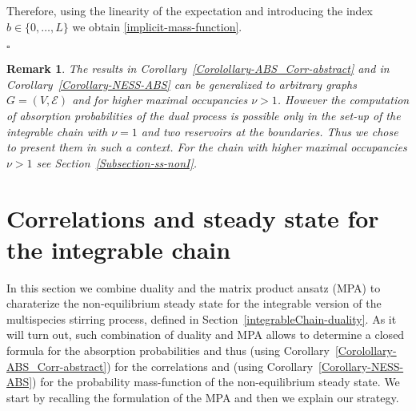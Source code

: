 \documentclass[10pt]{article}
\numberwithin{equation}{section}
\numberwithin{equation}{subsection}
\newtheorem{remark}{Remark}
\begin{document}
Therefore, using the linearity of the expectation and introducing the index $b\in \{0,\ldots,L\}$ we obtain \eqref{implicit-mass-function}. 
\begin{flushright}
	$\square$
\end{flushright}
\begin{remark}\label{Remark-extension-graph-nu}
	The results in Corollary~\ref{Corolollary-ABS_Corr-abstract} and in Corollary~\ref{Corollary-NESS-ABS}  can be generalized to arbitrary graphs $G=(V,\mathcal{E})$ and for higher maximal occupancies $\nu >1$.
	However the computation of absorption probabilities of the dual process is possible only in the set-up of the integrable chain with $\nu =1$ and two reservoirs at the boundaries.
	Thus we chose to present them in such a context. For the chain with higher maximal occupancies $\nu >1$ see Section~\ref{Subsection-ss-nonI}.
\end{remark}





\section{Correlations and steady state  for the integrable chain}\label{sectionIntegrabiliy}
In this section we combine duality and the matrix product ansatz (MPA) to charaterize the non-equilibrium steady state for the integrable version of the multispecies stirring process, defined in Section~\ref{integrableChain-duality}. 
As it will turn out, such combination of duality and MPA allows to determine a closed formula for the absorption probabilities and thus (using Corollary~\ref{Corolollary-ABS_Corr-abstract}) for the correlations
and (using Corollary~\ref{Corollary-NESS-ABS}) for the probability mass-function of the non-equilibrium steady state.
We start by recalling the formulation of the MPA  and then we explain our strategy.
\end{document}

